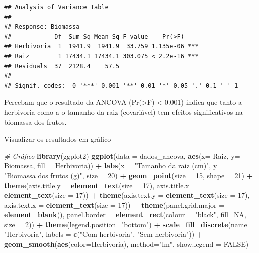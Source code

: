 \documentclass[
]{book}
\newenvironment{Shaded}{\begin{snugshade}}{\end{snugshade}}
\newcommand{\CommentTok}[1]{\textcolor[rgb]{0.56,0.35,0.01}{\textit{#1}}}
\newcommand{\DataTypeTok}[1]{\textcolor[rgb]{0.13,0.29,0.53}{#1}}
\newcommand{\DecValTok}[1]{\textcolor[rgb]{0.00,0.00,0.81}{#1}}
\newcommand{\KeywordTok}[1]{\textcolor[rgb]{0.13,0.29,0.53}{\textbf{#1}}}
\newcommand{\NormalTok}[1]{#1}
\newcommand{\OperatorTok}[1]{\textcolor[rgb]{0.81,0.36,0.00}{\textbf{#1}}}
\newcommand{\OtherTok}[1]{\textcolor[rgb]{0.56,0.35,0.01}{#1}}
\newcommand{\StringTok}[1]{\textcolor[rgb]{0.31,0.60,0.02}{#1}}
\begin{document}
\begin{verbatim}
## Analysis of Variance Table
## 
## Response: Biomassa
##            Df  Sum Sq Mean Sq F value    Pr(>F)    
## Herbivoria  1  1941.9  1941.9  33.759 1.135e-06 ***
## Raiz        1 17434.1 17434.1 303.075 < 2.2e-16 ***
## Residuals  37  2128.4    57.5                      
## ---
## Signif. codes:  0 '***' 0.001 '**' 0.01 '*' 0.05 '.' 0.1 ' ' 1
\end{verbatim}

Percebam que o resultado da ANCOVA (Pr(\textgreater F) \textless{} 0.001) indica que tanto a herbivoria como a o tamanho da raiz (covariável) tem efeitos significativos na biomassa dos frutos.

Visualizar os resultados em gráfico

\begin{Shaded}
\begin{Highlighting}[]
\CommentTok{# Gráfico}
\KeywordTok{library}\NormalTok{(ggplot2)}
\KeywordTok{ggplot}\NormalTok{(}\DataTypeTok{data =}\NormalTok{ dados_ancova, }\KeywordTok{aes}\NormalTok{(}\DataTypeTok{x=}\NormalTok{ Raiz, }\DataTypeTok{y=}\NormalTok{ Biomassa, }\DataTypeTok{fill =}\NormalTok{ Herbivoria)) }\OperatorTok{+}\StringTok{ }
\StringTok{  }\KeywordTok{labs}\NormalTok{(}\DataTypeTok{x =} \StringTok{"Tamanho da raiz (cm)"}\NormalTok{, }\DataTypeTok{y =} \StringTok{"Biomassa dos frutos (g)"}\NormalTok{, }\DataTypeTok{size =} \DecValTok{20}\NormalTok{) }\OperatorTok{+}
\StringTok{  }\KeywordTok{geom_point}\NormalTok{(}\DataTypeTok{size =} \DecValTok{15}\NormalTok{, }\DataTypeTok{shape =} \DecValTok{21}\NormalTok{) }\OperatorTok{+}
\StringTok{  }\KeywordTok{theme}\NormalTok{(}\DataTypeTok{axis.title.y =} \KeywordTok{element_text}\NormalTok{(}\DataTypeTok{size =} \DecValTok{17}\NormalTok{), }\DataTypeTok{axis.title.x =} \KeywordTok{element_text}\NormalTok{(}\DataTypeTok{size =} \DecValTok{17}\NormalTok{)) }\OperatorTok{+}
\StringTok{  }\KeywordTok{theme}\NormalTok{(}\DataTypeTok{axis.text.y =} \KeywordTok{element_text}\NormalTok{(}\DataTypeTok{size =} \DecValTok{17}\NormalTok{), }\DataTypeTok{axis.text.x =} \KeywordTok{element_text}\NormalTok{(}\DataTypeTok{size =} \DecValTok{17}\NormalTok{)) }\OperatorTok{+}
\StringTok{  }\KeywordTok{theme}\NormalTok{(}\DataTypeTok{panel.grid.major =} \KeywordTok{element_blank}\NormalTok{(),  }
        \DataTypeTok{panel.border =} \KeywordTok{element_rect}\NormalTok{(}\DataTypeTok{colour =} \StringTok{"black"}\NormalTok{, }\DataTypeTok{fill=}\OtherTok{NA}\NormalTok{, }\DataTypeTok{size =} \DecValTok{2}\NormalTok{)) }\OperatorTok{+}
\StringTok{  }\KeywordTok{theme}\NormalTok{(}\DataTypeTok{legend.position=}\StringTok{"bottom"}\NormalTok{) }\OperatorTok{+}
\StringTok{  }\KeywordTok{scale_fill_discrete}\NormalTok{(}\DataTypeTok{name =} \StringTok{"Herbivoria"}\NormalTok{, }\DataTypeTok{labels =} \KeywordTok{c}\NormalTok{(}\StringTok{"Com herbivoria"}\NormalTok{, }\StringTok{"Sem herbivoria"}\NormalTok{)) }\OperatorTok{+}
\StringTok{  }\KeywordTok{geom_smooth}\NormalTok{(}\KeywordTok{aes}\NormalTok{(}\DataTypeTok{color=}\NormalTok{Herbivoria), }\DataTypeTok{method=}\StringTok{"lm"}\NormalTok{, }\DataTypeTok{show.legend =} \OtherTok{FALSE}\NormalTok{)}
\end{Highlighting}
\end{Shaded}
\end{document}
